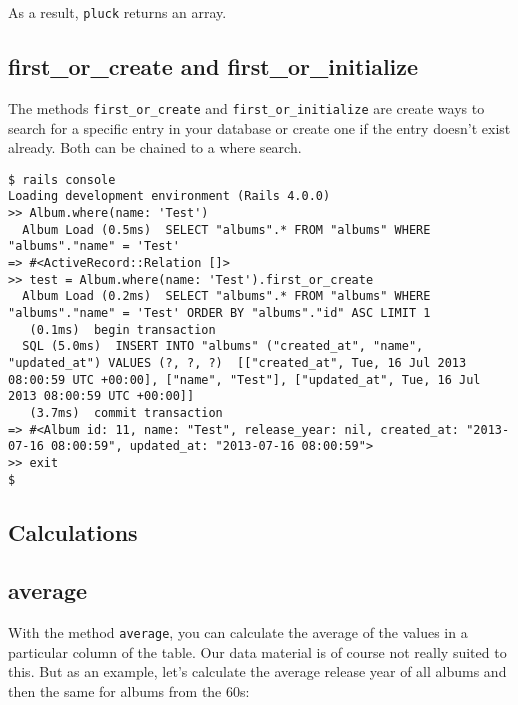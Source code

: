 \documentclass[a4paper]{book}
\newcounter{tab}[chapter]
\begin{document}
As a result, \texttt{pluck} returns an array.

\subsection{first\_or\_create and first\_or\_initialize}\label{firstux5forux5fcreate-and-firstux5forux5finitialize}

The methods \texttt{first\_or\_create} and \texttt{first\_or\_initialize} are create ways to search for a specific entry in your database or create one if the entry doesn't exist already. Both can be chained to a where search.

\begin{shaded}\begin{verbatim}
$ rails console
Loading development environment (Rails 4.0.0)
>> Album.where(name: 'Test')
  Album Load (0.5ms)  SELECT "albums".* FROM "albums" WHERE "albums"."name" = 'Test'
=> #<ActiveRecord::Relation []>
>> test = Album.where(name: 'Test').first_or_create
  Album Load (0.2ms)  SELECT "albums".* FROM "albums" WHERE "albums"."name" = 'Test' ORDER BY "albums"."id" ASC LIMIT 1
   (0.1ms)  begin transaction
  SQL (5.0ms)  INSERT INTO "albums" ("created_at", "name", "updated_at") VALUES (?, ?, ?)  [["created_at", Tue, 16 Jul 2013 08:00:59 UTC +00:00], ["name", "Test"], ["updated_at", Tue, 16 Jul 2013 08:00:59 UTC +00:00]]
   (3.7ms)  commit transaction
=> #<Album id: 11, name: "Test", release_year: nil, created_at: "2013-07-16 08:00:59", updated_at: "2013-07-16 08:00:59">
>> exit
$
\end{verbatim}\end{shaded}

\subsection{Calculations}\label{calculations}

\subsection{average}\label{average}

With the method \texttt{average}, you can calculate the average of the values in a particular column of the table. Our data material is of course not really suited to this. But as an example, let's calculate the average release year of all albums and then the same for albums from the 60s:
\end{document}

